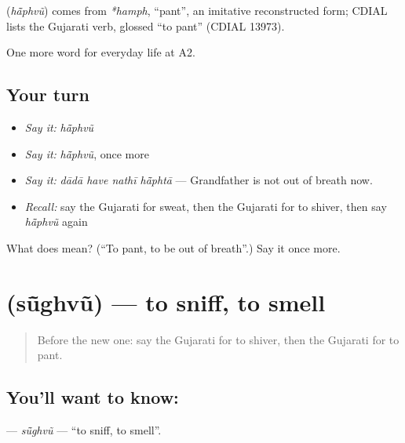 \begin{cousinweb}
\textbf{} (\emph{hā̃phvũ}) comes from \emph{*hamph}, \textquotedblleft{}pant\textquotedblright{}, an imitative reconstructed form; CDIAL lists the Gujarati verb, glossed \textquotedblleft{}to pant\textquotedblright{} (CDIAL 13973).
\end{cousinweb}

\begin{grammarlens}[title={What you've built}]
One more word for everyday life at A2.
\end{grammarlens}

\subsection*{Your turn}
\begin{itemize}
\raggedright
  \item \emph{Say it:} \emph{hā̃phvũ}
  \item \emph{Say it:} \emph{hā̃phvũ}, once more
  \item \emph{Say it:} \emph{dādā have nathī hā̃phtā} — Grandfather is not out of breath now.
  \item \emph{Recall:} say the Gujarati for sweat, then the Gujarati for to shiver, then say \emph{hā̃phvũ} again
\end{itemize}

\begin{tcolorbox}[breakable,colback=teal!4,colframe=teal!35!black,title={Before you move on}]
What does  mean? (\textquotedblleft{}To pant, to be out of breath\textquotedblright{}.) Say it once more.
\end{tcolorbox}
\section[\texorpdfstring{\gu{સૂંઘવું} (sū̃ghvũ)}{સૂંઘવું (sū̃ghvũ)}]{ (sū̃ghvũ) — to sniff, to smell}

\label{lesson:GU-C226-sughvu}



\begin{quote}
Before the new one: say the Gujarati for to shiver, then the Gujarati for to pant.
\end{quote}

\subsection*{You'll want to know: }
\textbf{} — \emph{sū̃ghvũ} — \textquotedblleft{}to sniff, to smell\textquotedblright{}.

